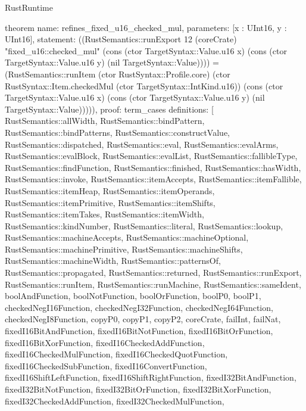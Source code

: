 \begin{lexlean}{RustRuntime}
\begin{semanticmodule}
theorem{
  name: refines_fixed_u16_checked_mul,
  parameters: [x : UInt16, y : UInt16],
  statement: ((RustSemantics::runExport 12 (coreCrate) "fixed_u16::checked_mul" (cons (ctor TargetSyntax::Value.u16 x) (cons (ctor TargetSyntax::Value.u16 y) (nil TargetSyntax::Value)))) = (RustSemantics::runItem (ctor RustSyntax::Profile.core) (ctor RustSyntax::Item.checkedMul (ctor TargetSyntax::IntKind.u16)) (cons (ctor TargetSyntax::Value.u16 x) (cons (ctor TargetSyntax::Value.u16 y) (nil TargetSyntax::Value))))),
  proof: term_cases{
    definitions: [
      RustSemantics::allWidth,
      RustSemantics::bindPattern,
      RustSemantics::bindPatterns,
      RustSemantics::constructValue,
      RustSemantics::dispatched,
      RustSemantics::eval,
      RustSemantics::evalArms,
      RustSemantics::evalBlock,
      RustSemantics::evalList,
      RustSemantics::fallibleType,
      RustSemantics::findFunction,
      RustSemantics::finished,
      RustSemantics::hasWidth,
      RustSemantics::invoke,
      RustSemantics::itemAccepts,
      RustSemantics::itemFallible,
      RustSemantics::itemHeap,
      RustSemantics::itemOperands,
      RustSemantics::itemPrimitive,
      RustSemantics::itemShifts,
      RustSemantics::itemTakes,
      RustSemantics::itemWidth,
      RustSemantics::kindNumber,
      RustSemantics::literal,
      RustSemantics::lookup,
      RustSemantics::machineAccepts,
      RustSemantics::machineOptional,
      RustSemantics::machinePrimitive,
      RustSemantics::machineShifts,
      RustSemantics::machineWidth,
      RustSemantics::patternsOf,
      RustSemantics::propagated,
      RustSemantics::returned,
      RustSemantics::runExport,
      RustSemantics::runItem,
      RustSemantics::runMachine,
      RustSemantics::sameIdent,
      boolAndFunction,
      boolNotFunction,
      boolOrFunction,
      boolP0,
      boolP1,
      checkedNegI16Function,
      checkedNegI32Function,
      checkedNegI64Function,
      checkedNegI8Function,
      copyP0,
      copyP1,
      copyP2,
      coreCrate,
      failInt,
      failNat,
      fixedI16BitAndFunction,
      fixedI16BitNotFunction,
      fixedI16BitOrFunction,
      fixedI16BitXorFunction,
      fixedI16CheckedAddFunction,
      fixedI16CheckedMulFunction,
      fixedI16CheckedQuotFunction,
      fixedI16CheckedSubFunction,
      fixedI16ConvertFunction,
      fixedI16ShiftLeftFunction,
      fixedI16ShiftRightFunction,
      fixedI32BitAndFunction,
      fixedI32BitNotFunction,
      fixedI32BitOrFunction,
      fixedI32BitXorFunction,
      fixedI32CheckedAddFunction,
      fixedI32CheckedMulFunction,
}}
\end{semanticmodule}
\end{lexlean}
